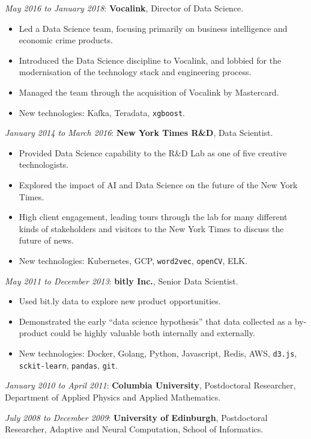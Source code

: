 \documentclass[line, overlapped]{res}
\providecommand{\tightlist}{%
  \setlength{\itemsep}{0pt}\setlength{\parskip}{0pt}}
\begin{document}
\begin{resume}
  \emph{May 2016 to January 2018}: \textbf{Vocalink}, Director of Data Science.
  \begin{itemize}
  \tightlist
	\item Led a Data Science team, focusing primarily on business intelligence and economic crime products. 
	\item Introduced the Data Science discipline to Vocalink, and lobbied for the modernisation of the technology stack and engineering process.
	\item Managed the team through the acquisition of Vocalink by Mastercard.
	\item New technologies: Kafka, Teradata, \texttt{xgboost}.
  \end{itemize}

  \emph{January 2014 to March 2016}: \textbf{New York Times R\&D}, Data
  Scientist.
  \begin{itemize}
  \tightlist
	  \item Provided Data Science capability to the R\&D Lab as one of five creative technologists. 
	\item Explored the impact of AI and Data Science on the future of the New York Times.
	\item High client engagement, leading tours through the lab for many different kinds of stakeholders and visitors to the New York Times to discuss the future of news.
	\item New technologies: Kubernetes, GCP, \texttt{word2vec}, \texttt{openCV}, ELK.
  \end{itemize}

  \emph{May 2011 to December 2013}: \textbf{bitly Inc.}, Senior Data Scientist.
  \begin{itemize}
  \tightlist
	\item Used bit.ly data to explore new product opportunities.
	\item Demonstrated the early ``data science hypothesis'' that data collected as a by-product could be highly valuable both internally and externally.
	\item New technologies: Docker, Golang, Python, Javascript, Redis, AWS, \texttt{d3.js}, \texttt{sckit-learn}, \texttt{pandas}, \texttt{git}.
  \end{itemize}


  \emph{January 2010 to April 2011}: \textbf{Columbia University},
  Postdoctoral Researcher, Department of Applied Physics and Applied
  Mathematics.

  \emph{July 2008 to December 2009}: \textbf{University of Edinburgh},
  Postdoctoral Researcher, Adaptive and Neural Computation, School of
  Informatics.


\end{resume}
\end{document}
